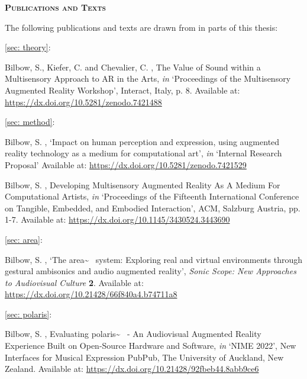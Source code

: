 \newpage
{}
{}
\begin{flushleft}
	\Huge \textsc{\textbf{Publications and Texts}}

\end{flushleft}
\noindent The following publications and texts are drawn from in parts of this thesis:

\noindent\autoref{sec: theory}: 

\begin{hangparas}{.25in}{1}
	Bilbow, S., Kiefer, C. and Chevalier, C. \citeyearpar{bilbow2021}, The Value of Sound within a Multisensory Approach to AR in the Arts, \textit{in} `Proceedings of the Multisensory Augmented Reality Workshop', Interact, Italy, p. 8. Available at: \url{https://dx.doi.org/10.5281/zenodo.7421488}
\end{hangparas}

\vspace*{0.75cm}
\noindent\autoref{sec: method}: 

\begin{hangparas}{.25in}{1}
	Bilbow, S. \citeyearpar{bilbow2020}, `Impact on human perception and expression, using augmented reality technology as a medium for computational art', \textit{in} `Internal Research Proposal' Available at: \url{https://dx.doi.org/10.5281/zenodo.7421529}
\end{hangparas}

\begin{hangparas}{.25in}{1}
	Bilbow, S. \citeyearpar{bilbow2021b}, Developing Multisensory Augmented Reality As A Medium For Computational Artists, \textit{in} `Proceedings of the Fifteenth International Conference on Tangible, Embedded, and Embodied Interaction', ACM, Salzburg Austria, pp. 1-7. Available at: \url{https://dx.doi.org/10.1145/3430524.3443690}
\end{hangparas}

\vspace*{0.75cm}
\noindent\autoref{sec: area}: 

\begin{hangparas}{.25in}{1}
	Bilbow, S. \citeyearpar{bilbow2021a}, `The area\textasciitilde{}~ system: Exploring real and virtual environments through gestural ambisonics and audio augmented reality', \textit{Sonic Scope: New Approaches to Audiovisual Culture} \textbf{2}. Available at: \url{https://dx.doi.org/10.21428/66f840a4.b74711a8}
\end{hangparas}

\vspace*{0.75cm}
\noindent\autoref{sec: polaris}: 

\begin{hangparas}{.25in}{1}
	Bilbow, S. \citeyearpar{bilbow2022}, Evaluating polaris\textasciitilde{}~ - An Audiovisual Augmented Reality Experience Built on Open-Source Hardware and Software, \textit{in} `NIME 2022', New Interfaces for Musical Expression PubPub, The University of Auckland, New Zealand. Available at: \url{https://dx.doi.org/10.21428/92fbeb44.8abb9ce6}
\end{hangparas}